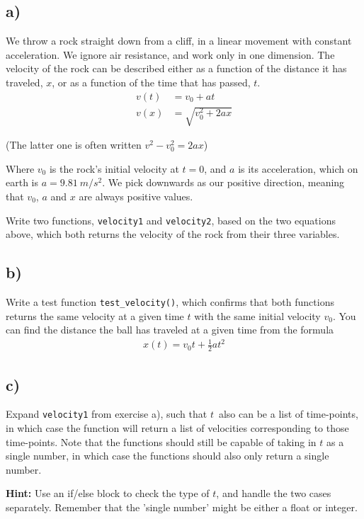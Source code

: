 \documentclass[10pt,a4paper]{article}
\newcommand{\half}{\frac{1}{2}}
\begin{document}
\subsection*{a)}
We throw a rock straight down from a cliff, in a linear movement with constant acceleration. We ignore air resistance, and work only in one dimension. The velocity of the rock can be described either as a function of the distance it has traveled, $x$, or as a function of the time that has passed, $t$.
\begin{align}
v(t) &= v_0 + at\\
v(x) &= \sqrt{v_0^2 + 2ax}
\end{align}

(The latter one is often written $v^2-v_0^2 = 2ax$)

Where $v_0$ is the rock's initial velocity at $t=0$, and $a$ is its acceleration, which on earth is $a = \SI{9.81}{m/s^2}$. We pick downwards as our positive direction, meaning that $v_0$, $a$ and $x$ are always positive values.

Write two functions, \texttt{velocity1} and \texttt{velocity2}, based on the two equations above, which both returns the velocity of the rock from their three variables.


\subsection*{b)}
Write a test function \texttt{test\_velocity()}, which confirms that both functions returns the same velocity at a given time $t$ with the same initial velocity $v_0$. You can find the distance the ball has traveled at a given time from the formula
\begin{align*}
x(t) = v_0t + \half a t^2
\end{align*}


\subsection*{c)}
Expand \texttt{velocity1} from exercise a), such that $t$ also can be a list of time-points, in which case the function will return a list of velocities corresponding to those time-points. Note that the functions should still be capable of taking in $t$ as a single number, in which case the functions should also only return a single number.

\textbf{Hint:} Use an if/else block to check the type of $t$, and handle the two cases separately. Remember that the 'single number' might be either a float or integer.
\end{document}

